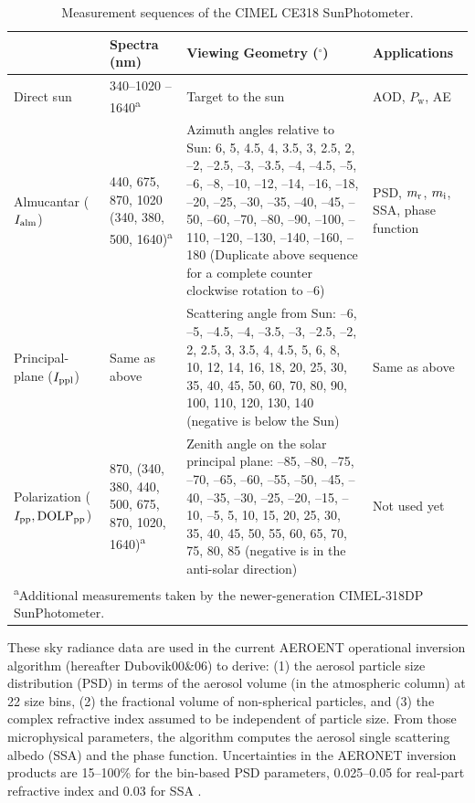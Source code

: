 \begin{table}[t]
  \centering
  \footnotesize
  \caption{Measurement sequences of the CIMEL CE318 SunPhotometer.}
  \label{tab:cimel318}
  \begin{tabular}{p{5em} p{8em} p{20em} p{6em} }
    \toprule
           & Spectra (nm)& Viewing Geometry ($^\circ$)& Applications \\ 
    \midrule
    Direct sun & 340--1020 \newline 340--1640\textsuperscript{a} & Target to
the sun & AOD, \newline $P_\text{w}$, AE \\
    \hline
    Almucantar ($I_\text{alm}$)& 440, 675, 870, 1020 \newline (340, 380, 500,
1640)\textsuperscript{a} & Azimuth angles relative to
Sun: 6, 5, 4.5, 4, 3.5, 3, 2.5, 2, --2, --2.5, --3, --3.5, --4, --4.5, --5, --6,
--8, --10, --12, --14, --16, --18, --20, --25, --30, --35, --40, --45, --50,
--60, --70, --80, --90, --100, --110, --120, --130, --140, --160, --180
(Duplicate above sequence for a complete counter clockwise rotation to --6) & 
PSD, \newline $m_\text{r}$, $m_\text{i}$, \newline SSA, \newline phase function\\
    \hline
    Principal-plane ($I_\text{ppl}$)& Same as above & Scattering angle from
Sun: --6, --5, --4.5, --4, --3.5, --3, --2.5, --2, 2, 2.5, 3, 3.5, 4, 4.5, 5,
6, 8, 10, 12, 14, 16, 18, 20, 25, 30, 35, 40, 45, 50, 60, 70, 80, 90, 100, 110, 
120, 130, 140 (negative is below the Sun) & Same as above \\
    \hline
    Polarization ($I_\text{pp}, \text{DOLP}_\text{pp}$) & 870, \newline (340, 380, 440, 500, 675, 870, 1020,
1640)\textsuperscript{a} & Zenith angle on the
solar principal plane: --85, --80, --75, --70, --65, --60, --55, --50, --45,
--40, --35, --30, --25, --20, --15, --10, --5, 5, 10, 15, 20, 25, 30, 35, 40, 
45, 50, 55, 60, 65, 70, 75, 80, 85 (negative is in the anti-solar direction) &
Not used yet \\
    \bottomrule
     \multicolumn{4}{m{35em}}{\textsuperscript{a}Additional measurements taken
by the newer-generation CIMEL-318DP SunPhotometer.}
  \end{tabular}
\end{table}

These sky radiance data are used in the current AEROENT operational inversion
algorithm \citep{Dubovik00a,Dubovik06} (hereafter Dubovik00\&06) to derive: 
(1) the aerosol particle size distribution (PSD) in
terms of the aerosol volume (in the atmospheric column) at 22 size bins, (2)
the fractional volume of non-spherical particles, and (3) the complex
refractive index assumed to be independent of particle size. From
those microphysical parameters, the \Dub algorithm computes the aerosol
single scattering albedo (SSA) and the phase function. Uncertainties in
the AERONET inversion products are 15--100\% for the bin-based PSD parameters,
0.025--0.05 for real-part refractive index and 0.03 for SSA \citep{Dubovik00b}.

